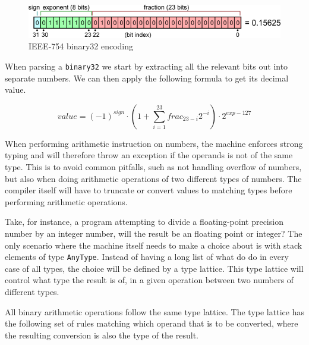 \begin{figure}[H]
  \centering
  \includegraphics[scale=0.7]{images/ieee32.png}
  \caption[Caption for LOF]{IEEE-754 binary32 encoding\footnotemark}
\end{figure}

When parsing a {\tt binary32} we start by extracting all the relevant bits out
into separate numbers. We can then apply the following formula to get its
decimal value.

\begin{equation}
  value = (-1)^{sign} \cdot (1 + \sum^{23}_{i=1} frac_{23-i}2^{-i}) \cdot 2^{exp - 127}
\end{equation}


When performing arithmetic instruction on numbers, the machine enforces strong
typing and will therefore throw an exception if the operands is not of the same
type. This is to avoid common pitfalls, such as not handling overflow of
numbers, but also when doing arithmetic operations of two different types of
numbers. The compiler itself will have to truncate or convert values to matching
types before performing arithmetic operations.

Take, for instance, a program attempting to divide a floating-point precision
number by an integer number, will the result be an floating point or integer?
The only scenario where the machine itself needs to make a choice about is with
stack elements of type {\tt AnyType}. Instead of having a long list of what do
do in every case of all types, the choice will be defined by a type
lattice. This type lattice will control what type the result is of, in a given
operation between two numbers of different types.

All binary arithmetic operations follow the same type lattice. The type lattice
has the following set of rules matching which operand that is to be converted,
where the resulting conversion is also the type of the result.

